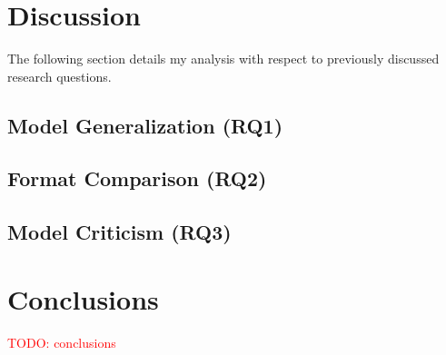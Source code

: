 \documentclass[review,sigconf]{acmart}
\newcommand{\todo}[1]{\textcolor{red}{TODO: #1}}
\begin{document}
\section{Discussion}

The following section details my analysis with respect to previously discussed research questions.

\subsection{Model Generalization (RQ1)}

\subsection{Format Comparison (RQ2)}

\subsection{Model Criticism (RQ3)}

\section{Conclusions}
\todo{conclusions}



\end{document}
